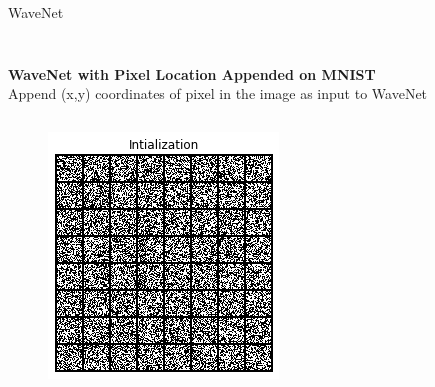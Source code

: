 \begin{frame}[allowframebreaks]{WaveNet}
\begin{columns}
\begin{column}{0.18\linewidth}
\begin{figure}
            \end{figure}
        \end{column}
    \end{columns}

    \framebreak

    \textbf{\large WaveNet with Pixel Location Appended on MNIST} \\
    \vspace{2em}
    Append (x,y) coordinates of pixel in the image as input to WaveNet
    \vspace{1em}
    \begin{columns}
        \begin{column}{0.18\linewidth}
            \begin{figure}
                \centering
                \includegraphics[width=1\linewidth]{images/autoregressive/mnist/init.png}
            \end{figure}
        \end{column}
        \begin{column}{0.18\linewidth}
            \begin{figure}
                \centering

\end{figure}
\end{column}
\end{columns}
\end{frame}
